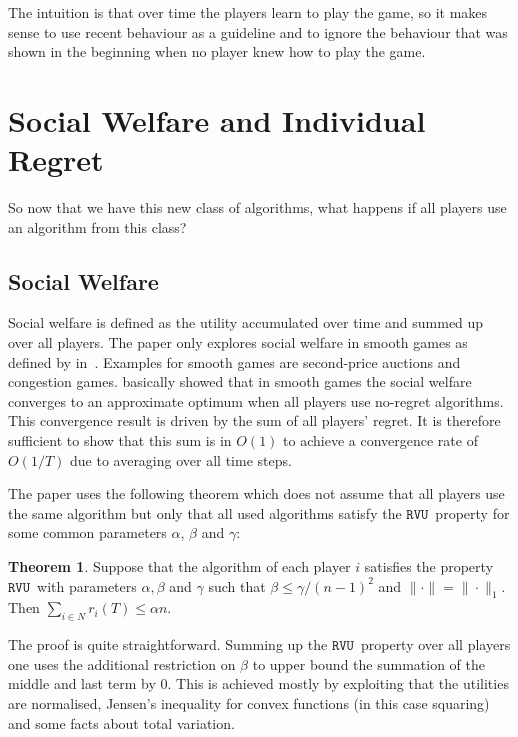 \documentclass[a4paper]{article}
\theoremstyle{definition}
\newtheorem{theorem}{Theorem}
\newcommand{\myprop}{\ensuremath{\texttt{RVU}}}
\begin{document}
The intuition is that over time the players learn to play the game, so
it makes sense to use recent behaviour as a guideline and to ignore the
behaviour that was shown in the beginning when no player knew how to
play the game.

\section{Social Welfare and Individual Regret}
So now that we have this new class of algorithms, what happens if all
players use an algorithm from this class?

\subsection{Social Welfare}
Social welfare is defined as the utility accumulated over time and summed up over all players.
The paper only explores social welfare in smooth games as defined by
\citeauthor{Roughgarden:2009:IRP:1536414.1536485} in~\cite{Roughgarden:2009:IRP:1536414.1536485}.
Examples for smooth games are second-price auctions and congestion
games.
\citeauthor{Roughgarden:2009:IRP:1536414.1536485} basically showed
that in smooth games the social welfare converges to an approximate
optimum when all players use no-regret algorithms.
This convergence result is driven by the sum of all players' regret.
It is therefore sufficient to show that this sum is in $O(1)$
to achieve a convergence rate of $O(1/T)$ due to averaging over all
time steps.

The paper uses the following theorem which does not assume that all
players use the same algorithm but only that all used algorithms
satisfy the \myprop~property for some common parameters $\alpha$, $\beta$ and $\gamma$:

\begin{theorem}\label{thm:sufficient}
Suppose that the algorithm of each player $i$ satisfies the property
\myprop~with parameters $\alpha, \beta$ and $\gamma$ such that
$\beta\leq \gamma/(n-1)^2$ and $\|\cdot\| = \|\cdot\|_1$. Then
$\sum_{i\in N} r_i(T) \leq \alpha n$.
\end{theorem}


The proof is quite straightforward.
Summing up the \myprop~property over all players one uses the
additional restriction on $\beta$ to upper bound the summation of the
middle and last term by 0. This is achieved mostly by exploiting that
the utilities are normalised, Jensen's
inequality for convex functions (in this case squaring) and some facts
about total variation.
\end{document}
